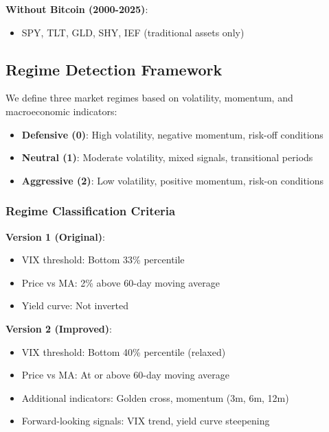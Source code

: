 \documentclass[twocolumn,ieee]{arithmaxresearch}
\begin{document}
\textbf{Without Bitcoin (2000-2025)}:
\begin{itemize}
    \item SPY, TLT, GLD, SHY, IEF (traditional assets only)
\end{itemize}

\subsection{Regime Detection Framework}

We define three market regimes based on volatility, momentum, and macroeconomic indicators:

\begin{definition}
\begin{itemize}
    \item \textbf{Defensive (0)}: High volatility, negative momentum, risk-off conditions
    \item \textbf{Neutral (1)}: Moderate volatility, mixed signals, transitional periods
    \item \textbf{Aggressive (2)}: Low volatility, positive momentum, risk-on conditions
\end{itemize}
\end{definition}

\subsubsection{Regime Classification Criteria}

\textbf{Version 1 (Original)}:
\begin{itemize}
    \item VIX threshold: Bottom 33\% percentile
    \item Price vs MA: 2\% above 60-day moving average
    \item Yield curve: Not inverted
\end{itemize}

\textbf{Version 2 (Improved)}:
\begin{itemize}
    \item VIX threshold: Bottom 40\% percentile (relaxed)
    \item Price vs MA: At or above 60-day moving average
    \item Additional indicators: Golden cross, momentum (3m, 6m, 12m)
    \item Forward-looking signals: VIX trend, yield curve steepening
\end{itemize}
\end{document}

